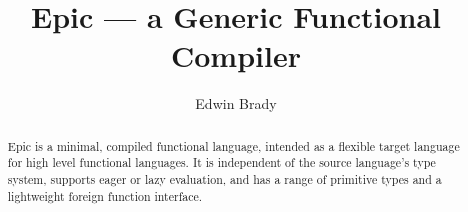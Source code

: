 \documentclass{article}
\newcounter{per}
\begin{document}
\title{Epic --- a Generic Functional Compiler}
\author{Edwin Brady}

\maketitle

\begin{abstract}
Epic is a minimal, compiled functional language, intended as a
flexible target language for high level functional languages. It is
independent of the source language's type system, supports eager or
lazy evaluation, and has a range of primitive types and a lightweight
foreign function interface.

\end{abstract}














\begin{small}


\appendix

%

\end{small}
\end{document}
